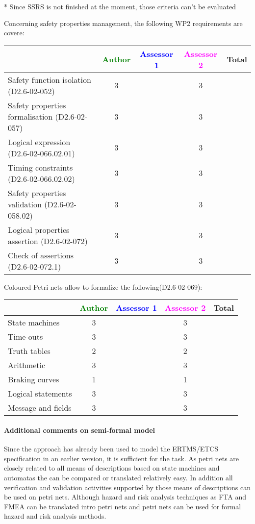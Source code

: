 \begin{assessor2}
* Since SSRS is not finished at the moment, those criteria can't be evaluated
\end{assessor2}

Concerning safety properties management, the following WP2 requirements are covere:

\begin{tabular}{|l | c | c | c | c|}
\hline
& \textcolor{green}{Author} & \textcolor{blue}{Assessor 1} & \textcolor{magenta}{Assessor 2} & Total \\
\hline 
Safety function isolation (D2.6-02-052)  & 3    & & 3    &  \\
\hline 
Safety properties formalisation (D2.6-02-057)  & 3    & & 3    &  \\
\hline
Logical expression (D2.6-02-066.02.01)  & 3    & & 3    &  \\
\hline
Timing constraints (D2.6-02-066.02.02)  & 3    & & 3    &  \\
\hline
Safety properties validation (D2.6-02-058.02)  & 3    & & 3    &  \\
\hline
Logical properties assertion (D2.6-02-072)  & 3    & & 3    &  \\
\hline
Check  of assertions (D2.6-02-072.1)  & 3    & & 3    &  \\
\hline
\end{tabular}

Coloured Petri nets allow to  formalize the following(D2.6-02-069):

\begin{tabular}{|l | c | c | c | c|}
\hline
& \textcolor{green}{Author} & \textcolor{blue}{Assessor 1} & \textcolor{magenta}{Assessor 2} & Total \\
\hline 
State machines  & 3    & & 3    &  \\
\hline
Time-outs  & 3    & & 3    &  \\
\hline
Truth tables  & 2    & & 2    &  \\
\hline
Arithmetic  & 3    & & 3    &  \\
\hline
Braking curves  & 1    & & 1    &  \\
\hline
Logical statements & 3    & & 3    &  \\
\hline
Message and fields & 3    & & 3    &  \\
\hline
\end{tabular}

\paragraph{Additional comments on semi-formal  model} 
Since the approach has already been used to model the ERTMS/ETCS specification in an earlier version, it is sufficient for the task.
As petri nets are closely related to all means of descriptions based on state machines and automatas the can be compared or translated relatively easy. In addition all verification and validation activities supported by those means of descriptions can be used on petri nets. Although hazard and risk analysis techniques as FTA and FMEA can be translated intro petri nets and petri nets can be used for formal hazard and risk analysis methods.


